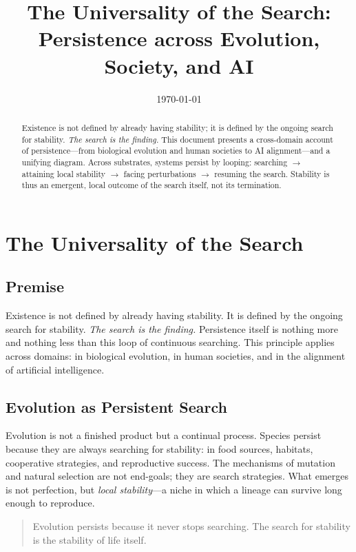 \documentclass[11pt,a4paper]{article}
\title{\textbf{The Universality of the Search:\\
Persistence across Evolution, Society, and AI}}
\author{}
\date{\today}
\begin{document}
\maketitle
\onehalfspacing

\begin{abstract}
Existence is not defined by already having stability; it is defined by the ongoing search for stability. 
\emph{The search is the finding.} 
This document presents a cross-domain account of persistence---from biological evolution and human societies to AI alignment---and a unifying diagram. 
Across substrates, systems persist by looping: searching $\rightarrow$ attaining local stability $\rightarrow$ facing perturbations $\rightarrow$ resuming the search. 
Stability is thus an emergent, local outcome of the search itself, not its termination.
\end{abstract}

\section*{The Universality of the Search}

\subsection*{Premise}
Existence is not defined by already having stability. 
It is defined by the ongoing search for stability. 
\emph{The search is the finding.} 
Persistence itself is nothing more and nothing less than this loop of continuous searching. 
This principle applies across domains: in biological evolution, in human societies, and in the alignment of artificial intelligence.

\subsection*{Evolution as Persistent Search}
Evolution is not a finished product but a continual process. 
Species persist because they are always searching for stability: in food sources, habitats, cooperative strategies, and reproductive success.  
The mechanisms of mutation and natural selection are not end-goals; they are search strategies. 
What emerges is not perfection, but \emph{local stability}---a niche in which a lineage can survive long enough to reproduce.  

\begin{quote}
Evolution persists because it never stops searching. 
The search for stability is the stability of life itself.
\end{quote}
\end{document}
